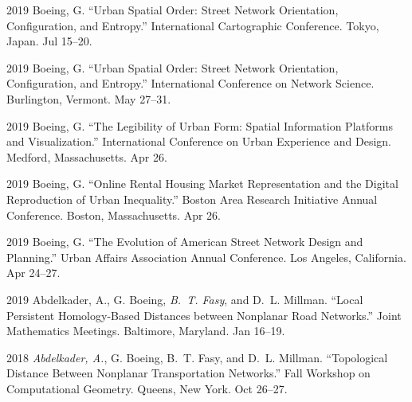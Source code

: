 \documentclass[12pt,letterpaper]{report}
\begin{document}
	\begin{tablist}



		\item[2019] \tab Boeing, G. \enquote{Urban Spatial Order: Street Network Orientation, Configuration, and Entropy.} International Cartographic Conference. Tokyo, Japan. Jul 15--20.

		\item[2019] \tab Boeing, G. \enquote{Urban Spatial Order: Street Network Orientation, Configuration, and Entropy.} International Conference on Network Science. Burlington, Vermont. May 27--31.

		\item[2019] \tab Boeing, G. \enquote{The Legibility of Urban Form: Spatial Information Platforms and Visualization.} International Conference on Urban Experience and Design. Medford, Massachusetts. Apr 26.

		\item[2019] \tab Boeing, G. \enquote{Online Rental Housing Market Representation and the Digital Reproduction of Urban Inequality.} Boston Area Research Initiative Annual Conference. Boston, Massachusetts. Apr 26.

		\item[2019] \tab Boeing, G. \enquote{The Evolution of American Street Network Design and Planning.} Urban Affairs Association Annual Conference. Los Angeles, California. Apr 24--27.

		\item[2019] \tab Abdelkader, A., G. Boeing, \textit{B.~T. Fasy}, and D.~L. Millman. \enquote{Local Persistent Homology-Based Distances between Nonplanar Road Networks.} Joint Mathematics Meetings. Baltimore, Maryland. Jan 16--19.

		\item[2018] \tab \textit{Abdelkader, A.}, G. Boeing, B.~T. Fasy, and D.~L. Millman. \enquote{Topological Distance Between Nonplanar Transportation Networks.} Fall Workshop on Computational Geometry. Queens, New York. Oct 26--27.


\end{tablist}
\end{document}
